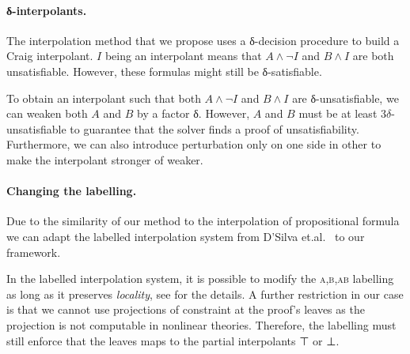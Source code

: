 
\paragraph{δ-interpolants.}
The interpolation method that we propose uses a δ-decision procedure to build a Craig interpolant.
$I$ being an interpolant means that $A ∧ ¬I$ and $B ∧ I$ are both unsatisfiable.
However, these formulas might still be δ-satisfiable.

To obtain an interpolant such that both $A ∧ ¬I$ and $B ∧ I$ are δ-unsatisfiable, we can weaken both $A$ and $B$ by a factor δ.
However, $A$ and $B$ must be at least $3δ$-unsatisfiable to guarantee that the solver finds a proof of unsatisfiability.
Furthermore, we can also introduce perturbation only on one side in other to make the interpolant stronger of weaker.

\paragraph{Changing the labelling.}
Due to the similarity of our method to the interpolation of propositional formula we can adapt the labelled interpolation system from D'Silva et.al.~\cite{DBLP:conf/vmcai/DSilvaKPW10} to our framework.

In the labelled interpolation system, it is possible to modify the \textsc{a,b,ab} labelling as long as it preserves \emph{locality}, see \cite{DBLP:conf/vmcai/DSilvaKPW10} for the details.
A further restriction in our case is that we cannot use projections of constraint at the proof's leaves as the projection is not computable in nonlinear theories.
Therefore, the labelling must still enforce that the leaves maps to the partial interpolants ⊤ or ⊥.
